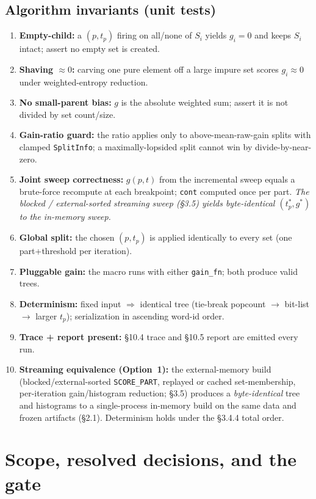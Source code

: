 \documentclass[11pt]{article}
\newcommand{\code}[1]{\texttt{#1}}
\newcommand{\cont}{\code{cont}}
\newcommand{\gfn}{\code{gain\_fn}}
\newcommand{\score}{\code{SCORE\_PART}}
\begin{document}
\subsection{Algorithm invariants (unit tests)}
\begin{enumerate}[nosep]
\item \textbf{Empty-child:} a $(p,t_p)$ firing on all/none of $S_i$ yields $g_i=0$ and keeps $S_i$ intact; assert no empty set is created.
\item \textbf{Shaving $\approx0$:} carving one pure element off a large impure set scores $g_i\approx0$ under weighted-entropy reduction.
\item \textbf{No small-parent bias:} $g$ is the absolute weighted sum; assert it is not divided by set count/size.
\item \textbf{Gain-ratio guard:} the ratio applies only to above-mean-raw-gain splits with clamped \code{SplitInfo}; a maximally-lopsided split cannot win by divide-by-near-zero.
\item \textbf{Joint sweep correctness:} $g(p,t)$ from the incremental sweep equals a brute-force recompute at each breakpoint; \cont{} computed once per part. \emph{The blocked / external-sorted streaming sweep (\S3.5) yields byte-identical $(t_p^*,g^*)$ to the in-memory sweep.}
\item \textbf{Global split:} the chosen $(p,t_p)$ is applied identically to every set (one part+threshold per iteration).
\item \textbf{Pluggable gain:} the macro runs with either \gfn{}; both produce valid trees.
\item \textbf{Determinism:} fixed input $\Rightarrow$ identical tree (tie-break popcount $\to$ bit-list $\to$ larger $t_p$); serialization in ascending word-id order.
\item \textbf{Trace + report present:} \S10.4 trace and \S10.5 report are emitted every run.
\item \textbf{Streaming equivalence (Option~1):} the external-memory build (blocked/external-sorted \score, replayed or cached set-membership, per-iteration gain/histogram reduction; \S3.5) produces a \emph{byte-identical} tree and histograms to a single-process in-memory build on the same data and frozen artifacts (\S2.1). Determinism holds under the \S3.4.4 total order.
\end{enumerate}


\section{Scope, resolved decisions, and the gate}
\end{document}
